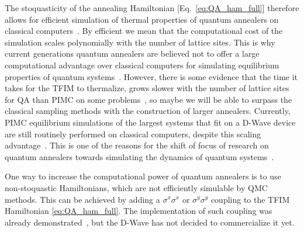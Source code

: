 \documentclass[12pt,a4paper]{article}
\begin{document}
\hspace*{0.3cm}
The stoquasticity of the annealing Hamiltonian [Eq.~\eqref{eq:QA_ham_full}] therefore allows for efficient simulation
of thermal properties of quantum annealers on classical computers~\cite*{bravyi2006complexity}.
By efficient we mean that the computational cost of the simulation scales polynomially with the number of lattice sites.
This is why current generations quantum annealers are believed not to offer
a large computational advantage over classical computers for simulating equilibrium properties of
quantum systems~\cite{crosson2021prospects}. However, there is some evidence that the time it takes for
the TFIM to thermalize, grows slower with the number of lattice sites for QA than PIMC on some problems~\cite*{king2021scaling},
so maybe we will be able to surpass the classical sampling methods with the construction of larger annealers.
Currently, PIMC equilibrium simulations of the largest systems that fit on a D-Wave device are still
routinely performed on classical computers, despite this scaling advantage~\cite*{king2021scaling}. This is one of the reasons for
the shift of focus of research on quantum annealers towards simulating the dynamics of quantum systems~\cite{king2024computational, king2023quantum, king2022coherent}.

\hspace*{0.3cm}
One way to increase the computational power of quantum annealers is to use non-stoquastic Hamiltonians,
which are not efficiently simulable by QMC methods. This can be achieved by adding a $\sigma^x \sigma^x$ or
$\sigma^y \sigma^y$ coupling to the TFIM Hamiltonian \eqref{eq:QA_ham_full}. The implementation of such
coupling was already demonstrated~\cite*{ozfidan2020demonstration}, but the D-Wave has not decided to
commercialize it yet.
\end{document}
